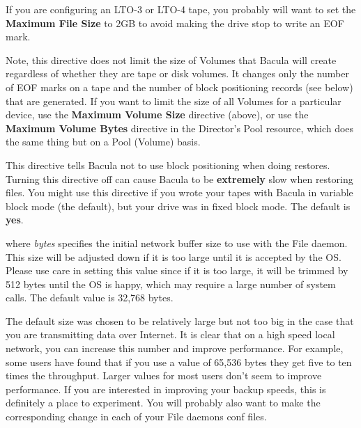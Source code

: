 \begin{description}
   If you are configuring an LTO-3 or LTO-4 tape, you probably will
   want to set the {\bf Maximum File Size} to 2GB to avoid making
   the drive stop to write an EOF mark.

   Note, this directive does not limit the size of Volumes that Bacula
   will create regardless of whether they are tape or disk volumes. It
   changes only the number of EOF marks on a tape and the number of
   block positioning records (see below) that are generated. If you
   want to limit the size of all Volumes for a particular device, use
   the {\bf Maximum Volume Size} directive (above), or use the
   {\bf Maximum Volume Bytes} directive in the Director's Pool resource,
   which does the same thing but on a Pool (Volume) basis.

\item [Block Positioning = {\it yes\vb{}no}]
   This directive tells Bacula not to use block positioning when doing restores.
   Turning this directive off can cause Bacula to be {\bf extremely} slow
   when restoring files.  You might use this directive if you wrote your
   tapes with Bacula in variable block mode (the default), but your drive
   was in fixed block mode. The default is {\bf yes}.

\item [Maximum Network Buffer Size = {\it bytes}]
   where {\it bytes} specifies the initial network buffer  size to use with the
   File daemon.  This size will be adjusted down if it is too large until
   it is accepted by the OS. Please use care in setting this value since if
   it is too large, it will be trimmed by 512 bytes until the OS is happy,
   which may require a large number of system calls.  The default value is
   32,768 bytes.

   The default size was chosen to be relatively large but not too big in
   the case that you are transmitting data over Internet.  It is clear that
   on a high speed local network, you can increase this number and improve
   performance. For example, some users have found that if you use a value
   of 65,536 bytes they get five to ten times the throughput.  Larger values for
   most users don't seem to improve performance. If you are interested
   in improving your backup speeds, this is definitely a place to
   experiment. You will probably also want to make the corresponding change
   in each of your File daemons conf files.



\end{description}
